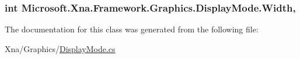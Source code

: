 \subsubsection[{Width}]{\setlength{\rightskip}{0pt plus 5cm}int Microsoft.\+Xna.\+Framework.\+Graphics.\+Display\+Mode.\+Width\hspace{0.3cm}{\ttfamily [get]}, {\ttfamily [set]}}\label{class_microsoft_1_1_xna_1_1_framework_1_1_graphics_1_1_display_mode_a7f08e0a0110e1fae84bc64c34b3ce748}


The documentation for this class was generated from the following file\+:\begin{DoxyCompactItemize}
\item 
Xna/\+Graphics/\hyperlink{_display_mode_8cs}{Display\+Mode.\+cs}\end{DoxyCompactItemize}
